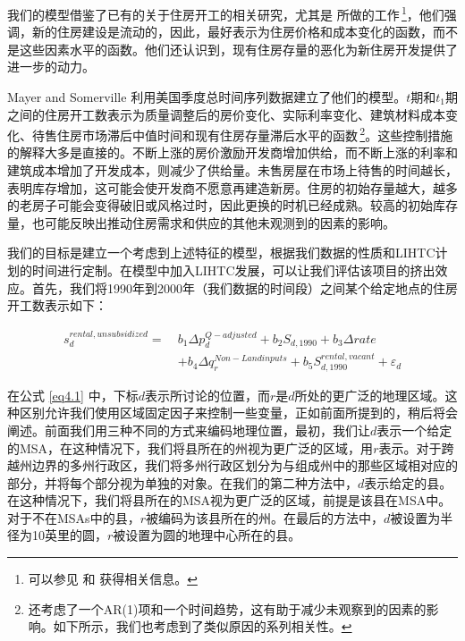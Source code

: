 \documentclass[lang=cn,11pt,a4paper]{paper}
\begin{document}
我们的模型借鉴了已有的关于住房开工的相关研究，尤其是 \cite{Mayer200085} 所做的工作\,\footnote{可以参见 \cite{Topel1988718} 和 \cite{DiPasquale1992337} 获得相关信息。}，他们强调，新的住房建设是流动的，因此，最好表示为住房价格和成本变化的函数，而不是这些因素水平的函数。他们还认识到，现有住房存量的恶化为新住房开发提供了进一步的动力。

Mayer and Somerville 利用美国季度总时间序列数据建立了他们的模型。$t$期和$t_1$期之间的住房开工数表示为质量调整后的房价变化、实际利率变化、建筑材料成本变化、待售住房市场滞后中值时间和现有住房存量滞后水平的函数\,\footnote{\cite{Mayer200085} 还考虑了一个AR(1)项和一个时间趋势，这有助于减少未观察到的因素的影响。如下所示，我们也考虑到了类似原因的系列相关性。}。这些控制措施的解释大多是直接的。不断上涨的房价激励开发商增加供给，而不断上涨的利率和建筑成本增加了开发成本，则减少了供给量。未售房屋在市场上待售的时间越长，表明库存增加，这可能会使开发商不愿意再建造新房。住房的初始存量越大，越多的老房子可能会变得破旧或风格过时，因此更换的时机已经成熟。较高的初始库存量，也可能反映出推动住房需求和供应的其他未观测到的因素的影响。

我们的目标是建立一个考虑到上述特征的模型，根据我们数据的性质和LIHTC计划的时间进行定制。在模型中加入LIHTC发展，可以让我们评估该项目的挤出效应。首先，我们将1990年到2000年（我们数据的时间段）之间某个给定地点的住房开工数表示如下：

\begin{equation}\label{eq4.1}
  \begin{aligned}
  s_{d}^{rental,unsubsidized}=\ & b_{1} \Delta p_{d}^{Q-adjusted}+b_{2} S_{d, 1990}+b_{3} \Delta r a t e \\
  &+b_{4} \Delta q_{r}^{Non-Landinputs}+b_{5} S_{d, 1990}^{rental, vacant}+\varepsilon_{d}
  \end{aligned}
\end{equation}
\vspace{2pt}

在公式 \eqref{eq4.1} 中，下标$d$表示所讨论的位置，而$r$是$d$所处的更广泛的地理区域。这种区别允许我们使用区域固定因子来控制一些变量，正如前面所提到的，稍后将会阐述。前面我们用三种不同的方式来编码地理位置，最初，我们让$d$表示一个给定的MSA，在这种情况下，我们将县所在的州视为更广泛的区域，用$r$表示。对于跨越州边界的多州行政区，我们将多州行政区划分为与组成州中的那些区域相对应的部分，并将每个部分视为单独的对象。在我们的第二种方法中，$d$表示给定的县。在这种情况下，我们将县所在的MSA视为更广泛的区域，前提是该县在MSA中。对于不在MSAs中的县，$r$被编码为该县所在的州。在最后的方法中，$d$被设置为半径为10英里的圆，$r$被设置为圆的地理中心所在的县。
\end{document}
